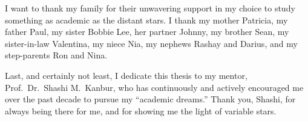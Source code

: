 I want to thank my family for their unwavering support in my choice to study something as academic as the distant stars. 
I thank my mother Patricia, my father Paul, my sister Bobbie Lee, her partner Johnny, my brother Sean, my sister-in-law Valentina, my niece Nia, my nephews Rashay and Darius, and my step-parents Ron and Nina. 

Last, and certainly not least, I dedicate this thesis to my mentor, Prof.\ Dr.\ Shashi M.\ Kanbur, who has continuously and actively encouraged me over the past decade to pursue my ``academic dreams.'' 
Thank you, Shashi, for always being there for me, and for showing me the light of variable stars. 
